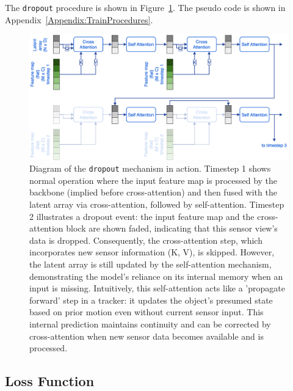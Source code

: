 The \texttt{dropout} procedure is shown in Figure~\ref{fig:figure_methods_recurrent_perceiver_with_dropout}. The pseudo code is shown in Appendix~\ref{Appendix:TrainProcedures}.

\begin{figure}
    \centering
    \includegraphics[width=\textwidth]{figures/figure_methods_recurrent_perceiver_with_dropout.png}
    \caption{Diagram of the \texttt{dropout} mechanism in action. Timestep 1 shows normal operation where the input feature map is processed by the backbone (implied before cross-attention) and then fused with the latent array via cross-attention, followed by self-attention. Timestep 2 illustrates a dropout event: the input feature map and the cross-attention block are shown faded, indicating that this sensor view's data is dropped. Consequently, the cross-attention step, which incorporates new sensor information (K, V), is skipped. However, the latent array is still updated by the self-attention mechanism, demonstrating the model's reliance on its internal memory when an input is missing. Intuitively, this self-attention acts like a 'propagate forward' step in a tracker: it updates the object's presumed state based on prior motion even without current sensor input. This internal prediction maintains continuity and can be corrected by cross-attention when new sensor data becomes available and is processed.}
    \label{fig:figure_methods_recurrent_perceiver_with_dropout}
\end{figure}

\subsection{Loss Function} \label{Methods:LossFunction}

